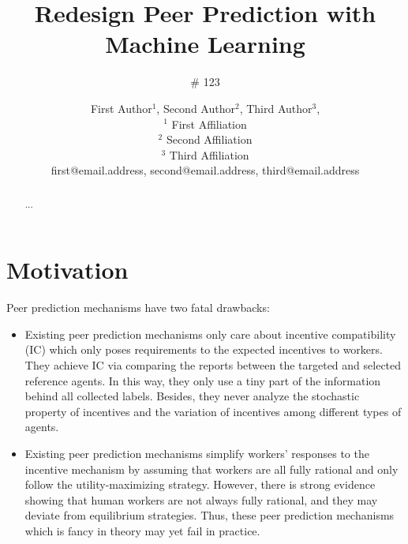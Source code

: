 \documentclass{article}
\title{Redesign Peer Prediction with Machine Learning}
\author{\# 123}
\author{
First Author$^1$, 
Second Author$^2$, 
Third Author$^3$, 
\\ 
$^1$ First Affiliation \\
$^2$ Second Affiliation\\
$^3$ Third Affiliation  \\
%
first@email.address,
second@email.address,
third@email.address
}
\begin{document}
\maketitle

\begin{abstract}
...
\end{abstract}

\section{Motivation}
Peer prediction mechanisms have two fatal drawbacks:
\begin{itemize}
\item Existing peer prediction mechanisms only care about incentive compatibility (IC) which only poses requirements to the expected incentives to workers. They achieve IC via comparing the reports between the targeted and selected reference agents. In this way, they only use a tiny part of the information behind all collected labels. Besides, they never analyze the stochastic property of incentives and the variation of incentives among different types of agents.
\item Existing peer prediction mechanisms simplify workers' responses to the incentive mechanism by assuming that workers are all fully rational and only follow the utility-maximizing strategy. However, there is strong evidence showing that human workers are not always fully rational, and they may deviate from equilibrium strategies. Thus, these peer prediction mechanisms which is fancy in theory may yet fail in practice.
\end{itemize}
\end{document}
